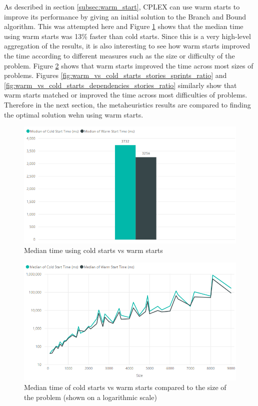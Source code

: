As described in section \ref{subsec:warm_start}, CPLEX can use warm starts to improve its performance by giving an initial solution to the Branch and Bound algorithm. This was attempted here and Figure \ref{fig:warm_vs_cold_starts_time} shows that the median time using warm starts was 13\% faster than cold starts. Since this is a very high-level aggregation of the results, it is also interesting to see how warm starts improved the time according to different measures such as the size or difficulty of the problem. Figure \ref{fig:warm_vs_cold_starts_size} shows that warm starts improved the time across most sizes of problems. Figures \ref{fig:warm_vs_cold_starts_stories_sprints_ratio} and \ref{fig:warm_vs_cold_starts_dependencies_stories_ratio} similarly show that warm starts matched or improved the time across most difficulties of problems. Therefore in the next section, the metaheuristics results are compared to finding the optimal solution wehn using warm starts.

\begin{figure}[h!]
    \centering
    \includegraphics[width=\textwidth]{Figures/WarmVsColdStarts/warm_vs_cold_time.png}
     \caption{Median time using cold starts vs warm starts}
     \label{fig:warm_vs_cold_starts_time}
\end{figure}

\begin{figure}[h!]
    \centering
    \includegraphics[width=\textwidth]{Figures/WarmVsColdStarts/warm_vs_cold_size.png}
     \caption{Median time of cold starts vs warm starts compared to the size of the problem (shown on a logarithmic scale)}
     \label{fig:warm_vs_cold_starts_size}
\end{figure}

